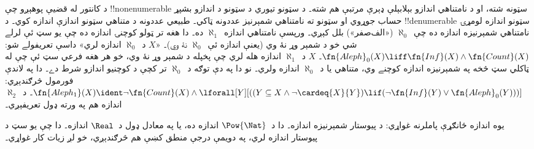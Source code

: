\documentclass[../../../include/open-logic-section]{subfiles}
\begin{document}
د کانتور له قضيې پوهېږو چې !!{nonenumerable} سټونه شته، او د
نامتناهي اندازو بېلابېلې ډېرې مرتبې هم شته۔ د سټونو تيوري
د سټونو د اندازو بشپړ حساب جوړوي او سټونو ته نامتناهي
شمېرنيز عددونه ټاکي۔ طبيعي عددونه د متناهي سټونو اندازې
اندازه کوي۔ د !!{denumerable} سټونو اندازه لومړۍ نامتناهي
شمېرنيزه اندازه ده چې~$\aleph_0$ («الف‌صفر») بلل کېږي۔
ورپسې نامتناهي اندازه~$\aleph_1$ ده۔ دا هغه تر ټولو کوچنۍ
اندازه ده چې يو سټ ئې لرلے شي خو د شمېر وړ نۀ وي (يعنې
اندازه ئې~$\aleph_0$ نۀ وي)۔ «$X$ د~$\aleph_0$ اندازه لري»
داسې تعريفولے شو: $\fn{Aleph}_0(X) \liff \fn{Inf}(X) \land \fn{Count}(X)$۔
$X$ د~$\aleph_1$ اندازه هله لري چې پخپله د شمېر وړ نۀ وي،
خو هر هغه فرعي سټ ئې چې له ټاکلي سټ څخه په شمېرنيزه اندازه
کوچنے وي، متناهي يا د~$\aleph_0$ اندازه ولري۔ نو دا په
دې توګه د~$\aleph_0$ تر کچې د کوچنيو اندازو شرط دے۔ دا په
لاندې فورمول څرګندېږي:
$\fn{Aleph_1}(X) \ident \lnot \fn{Count}(X) \land
\lforall[Y][((Y \subseteq X \land \lnot \cardeq{X}{Y}) \lif
  (\lnot\fn{Inf}(Y) \lor \fn{Aleph}_0(Y)))]$۔ د~$\aleph_2$
اندازه هم په ورته ډول تعريفېږي۔

يوه اندازه ځانګړې پاملرنه غواړي: د پيوستار شمېرنيزه اندازه۔
دا د~$\Pow{\Nat}$ اندازه ده، يا په معادل ډول د~$\Real$ اندازه۔
دا چې يو سټ د پيوستار اندازه لري، په دويمې درجې منطق کښې هم
څرګندېږي، خو لږ زيات کار غواړي۔
\end{document}
